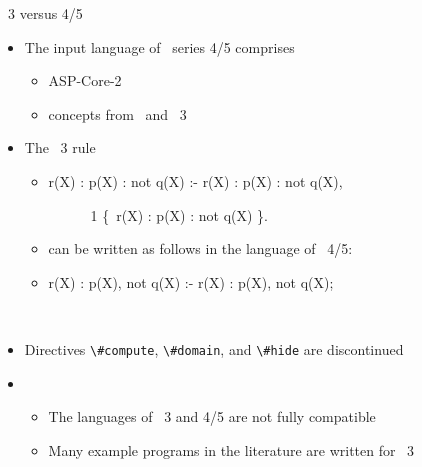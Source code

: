 \begin{frame}{\gringo~3 versus 4/5}
\begin{itemize}
\item The input language of \gringo\ series 4/5 comprises
  \begin{itemize}
  \item ASP-Core-2
  \item concepts from \lparse\ and \gringo\ 3
  \end{itemize}
\item<2->  
  The \gringo\ 3 rule
  \begin{itemize}
  \item 
\begin{semiverbatim}
  r(X) : p(X) : not q(X) :- r(X) : p(X) : not q(X), 

  \ \ \ \ \ \ 1 \{\ r(X) : p(X) : not q(X) \}.
\end{semiverbatim}
    
  \item<3->[] can be written as follows in the language of \gringo\ 4/5:
    \smallskip
  \item<3-> 
\begin{semiverbatim}
  r(X) : p(X), not q(X) :- r(X) : p(X), not q(X); 

  \ \ \ \ \ \ 
\end{semiverbatim}
  \end{itemize}
\item<5->  Directives {\small\lstinline{\#compute}}, {\small\lstinline{\#domain}}, and {\small\lstinline{\#hide}} are discontinued
\item<6-> 
  \begin{itemize}
  \item The languages of \gringo\ 3 and 4/5 are not fully compatible
  \item Many example programs in the literature are written for \gringo\ 3
  \end{itemize}
\end{itemize}
\end{frame}


